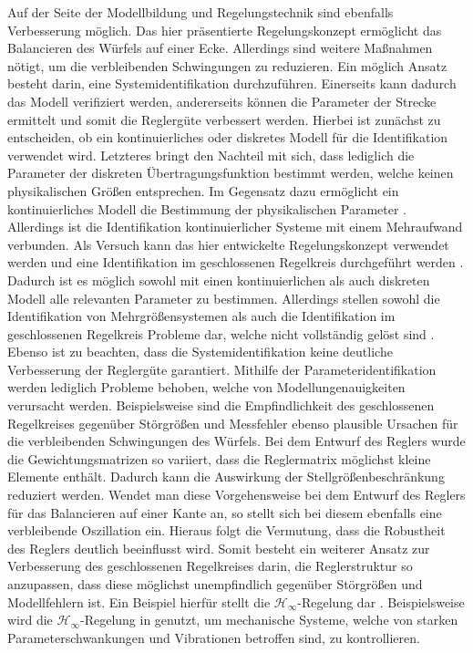 Auf der Seite der Modellbildung und Regelungstechnik sind ebenfalls Verbesserung möglich. Das hier präsentierte Regelungskonzept ermöglicht das Balancieren des Würfels auf einer Ecke. Allerdings sind weitere Maßnahmen nötigt, um die verbleibenden Schwingungen zu reduzieren. Ein möglich Ansatz besteht darin, eine Systemidentifikation durchzuführen. Einerseits kann dadurch das Modell verifiziert werden, andererseits können die Parameter der Strecke ermittelt und somit die Reglergüte verbessert werden. Hierbei ist zunächst zu entscheiden, ob ein kontinuierliches oder diskretes Modell für die Identifikation verwendet wird. Letzteres bringt den Nachteil mit sich, dass lediglich die Parameter der diskreten Übertragungsfunktion bestimmt werden, welche keinen physikalischen Größen entsprechen. Im Gegensatz dazu ermöglicht ein kontinuierliches Modell die Bestimmung der physikalischen Parameter \cite[S. 189 ff.]{UnbehauenSysId}. Allerdings ist die Identifikation kontinuierlicher Systeme mit einem Mehraufwand verbunden.
Als Versuch kann das hier entwickelte Regelungskonzept verwendet werden und eine Identifikation im geschlossenen Regelkreis durchgeführt werden \cite[S. 126 ff.]{UnbehauenSysId}. Dadurch ist es möglich sowohl mit einen kontinuierlichen als auch diskreten Modell alle relevanten Parameter zu bestimmen. Allerdings stellen sowohl die Identifikation von Mehrgrößensystemen als auch die Identifikation im geschlossenen Regelkreis Probleme dar, welche nicht vollständig gelöst sind \cite[S. 187 f.]{UnbehauenSysId}. Ebenso ist zu beachten, dass die Systemidentifikation keine deutliche Verbesserung der Reglergüte garantiert. Mithilfe der Parameteridentifikation werden lediglich Probleme behoben, welche von Modellungenauigkeiten verursacht werden. Beispielsweise sind die Empfindlichkeit des geschlossenen Regelkreises gegenüber Störgrößen und Messfehler ebenso plausible Ursachen für die verbleibenden Schwingungen des Würfels. 
Bei dem Entwurf des Reglers wurde die Gewichtungsmatrizen so variiert, dass die Reglermatrix möglichst kleine Elemente enthält. Dadurch kann die Auswirkung der Stellgrößenbeschränkung reduziert werden. Wendet man diese Vorgehensweise bei dem Entwurf des Reglers für das Balancieren auf einer Kante an, so stellt sich bei diesem ebenfalls eine verbleibende Oszillation ein. Hieraus folgt die Vermutung, dass die Robustheit des Reglers deutlich beeinflusst wird.
Somit besteht ein weiterer Ansatz zur Verbesserung des geschlossenen Regelkreises darin, die Reglerstruktur so anzupassen, dass diese möglichst unempfindlich gegenüber Störgrößen und Modellfehlern ist. Ein Beispiel hierfür stellt die $\mathcal{H}_\infty$-Regelung dar \cite[S. 224 ff.]{Ludyk}. Beispielsweise wird die $\mathcal{H}_\infty$-Regelung in \cite{Toda} genutzt, um mechanische Systeme, welche von starken Parameterschwankungen und Vibrationen betroffen sind, zu kontrollieren. 

